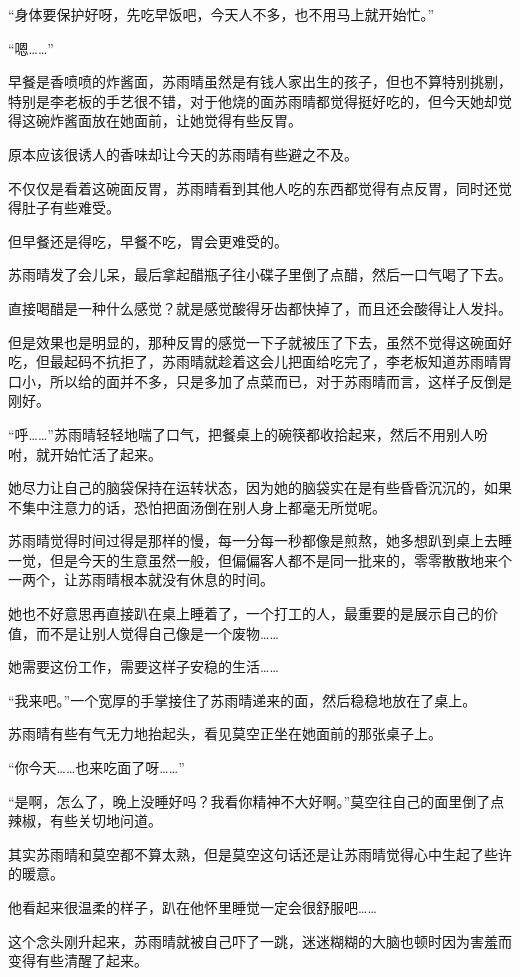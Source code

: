 “身体要保护好呀，先吃早饭吧，今天人不多，也不用马上就开始忙。”

“嗯……”

早餐是香喷喷的炸酱面，苏雨晴虽然是有钱人家出生的孩子，但也不算特别挑剔，特别是李老板的手艺很不错，对于他烧的面苏雨晴都觉得挺好吃的，但今天她却觉得这碗炸酱面放在她面前，让她觉得有些反胃。

原本应该很诱人的香味却让今天的苏雨晴有些避之不及。

不仅仅是看着这碗面反胃，苏雨晴看到其他人吃的东西都觉得有点反胃，同时还觉得肚子有些难受。

但早餐还是得吃，早餐不吃，胃会更难受的。

苏雨晴发了会儿呆，最后拿起醋瓶子往小碟子里倒了点醋，然后一口气喝了下去。

直接喝醋是一种什么感觉？就是感觉酸得牙齿都快掉了，而且还会酸得让人发抖。

但是效果也是明显的，那种反胃的感觉一下子就被压了下去，虽然不觉得这碗面好吃，但最起码不抗拒了，苏雨晴就趁着这会儿把面给吃完了，李老板知道苏雨晴胃口小，所以给的面并不多，只是多加了点菜而已，对于苏雨晴而言，这样子反倒是刚好。

“呼……”苏雨晴轻轻地喘了口气，把餐桌上的碗筷都收拾起来，然后不用别人吩咐，就开始忙活了起来。

她尽力让自己的脑袋保持在运转状态，因为她的脑袋实在是有些昏昏沉沉的，如果不集中注意力的话，恐怕把面汤倒在别人身上都毫无所觉呢。

苏雨晴觉得时间过得是那样的慢，每一分每一秒都像是煎熬，她多想趴到桌上去睡一觉，但是今天的生意虽然一般，但偏偏客人都不是同一批来的，零零散散地来个一两个，让苏雨晴根本就没有休息的时间。

她也不好意思再直接趴在桌上睡着了，一个打工的人，最重要的是展示自己的价值，而不是让别人觉得自己像是一个废物……

她需要这份工作，需要这样子安稳的生活……

“我来吧。”一个宽厚的手掌接住了苏雨晴递来的面，然后稳稳地放在了桌上。

苏雨晴有些有气无力地抬起头，看见莫空正坐在她面前的那张桌子上。

“你今天……也来吃面了呀……”

“是啊，怎么了，晚上没睡好吗？我看你精神不大好啊。”莫空往自己的面里倒了点辣椒，有些关切地问道。

其实苏雨晴和莫空都不算太熟，但是莫空这句话还是让苏雨晴觉得心中生起了些许的暖意。

他看起来很温柔的样子，趴在他怀里睡觉一定会很舒服吧……

这个念头刚升起来，苏雨晴就被自己吓了一跳，迷迷糊糊的大脑也顿时因为害羞而变得有些清醒了起来。

